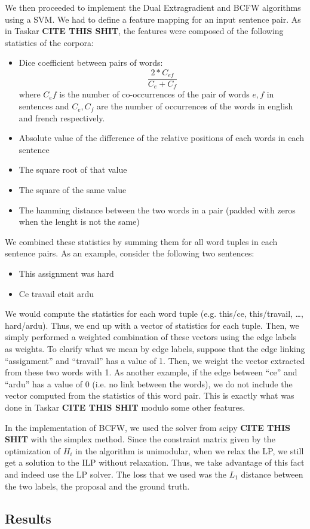 We then proceeded to implement the Dual Extragradient and BCFW algorithms using a SVM. We had to define a feature mapping for an input sentence pair. As in Taskar \textbf{CITE THIS SHIT}, the features were composed of the following statistics of the corpora:
\begin{itemize}
  \item Dice coefficient between pairs of words:
    \begin{equation*}
      \frac{2*C_{ef}}{C_e + C_f}
    \end{equation*}
    where $C_ef$ is the number of co-occurrences of the pair of words $e,f$ in sentences and $C_e, C_f$ are the number of occurrences
    of the words in english and french respectively.

  \item Absolute value of the difference of the relative positions of each words in each sentence

  \item The square root of that value

  \item The square of the same value

  \item The hamming distance between the two words in a pair (padded with zeros when the lenght is not the same)

\end{itemize}
We combined these statistics by summing them for all word tuples in each sentence pairs. As an example, consider the following two sentences:
\begin{itemize}
  \item This assignment was hard
  \item Ce travail etait ardu
\end{itemize}
We would compute the statistics for each word tuple (e.g. this/ce, this/travail, \dots, hard/ardu). Thus, we end up with a vector of statistics for each tuple. Then, we simply performed a weighted combination of these vectors using the edge labels as weights. To clarify what we mean by edge labels, suppose that the edge linking ``assignment'' and ``travail'' has a value of 1. Then, we weight the vector extracted from these two words with 1. As another example, if the edge between ``ce'' and ``ardu'' has a value of 0 (i.e. no link between the words), we do not include the vector computed from the statistics of this word pair. This is exactly what was done in Taskar \textbf{CITE THIS SHIT} modulo some other features.

In the implementation of BCFW, we used the solver from scipy \textbf{CITE THIS SHIT} with the simplex method. Since the constraint matrix given by the optimization of $H_i$ in the algorithm is unimodular, when we relax the LP, we still get a solution to the ILP without relaxation. Thus, we take advantage of this fact and indeed use the LP solver. The loss that we used was the $L_1$ distance between the two labels, the proposal and the ground truth.

\subsection{Results}
